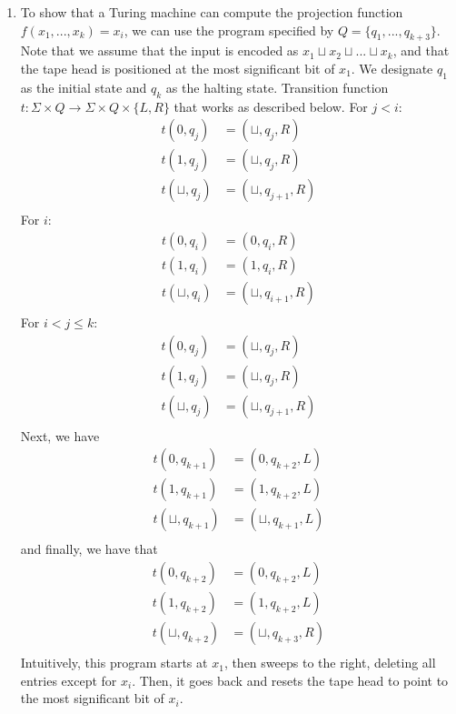 \documentclass{article}
\begin{document}
\begin{enumerate}
    \item To show that a Turing machine can compute the projection function $f(x_1, ..., x_k) = x_i$, we can use the program specified by $Q = \{q_1, ..., q_{k+3}\}$. 
    Note that we assume that the input is encoded as $x_1 \sqcup x_2 \sqcup ... \sqcup x_k$, and that the tape head is positioned at the most significant bit of $x_1$.
    We designate $q_1$ as the initial state and $q_k$ as the halting state. 
    Transition function $t: \Sigma \times Q \to \Sigma \times Q \times \{L, R\}$ that works as described below.
    For $j < i$:
    \begin{align*}
        t(0, q_j) &= (\sqcup, q_j, R)\\
        t(1, q_j) &= (\sqcup, q_j, R)\\
        t(\sqcup, q_j) &= (\sqcup, q_{j+1}, R) \\
    \end{align*}
    For $i$:
    \begin{align*}
        t(0, q_i) &= (0, q_i, R)\\
        t(1, q_i) &= (1, q_i, R)\\
        t(\sqcup, q_i) &= (\sqcup, q_{i+1}, R) \\
    \end{align*}
    For $i < j \leq k$:
    \begin{align*}
        t(0, q_j) &= (\sqcup, q_j, R)\\
        t(1, q_j) &= (\sqcup, q_j, R)\\
        t(\sqcup, q_j) &= (\sqcup, q_{j+1}, R) \\
    \end{align*}
    Next, we have
    \begin{align*}
        t(0, q_{k+1}) &= (0, q_{k+2}, L)\\
        t(1, q_{k+1}) &= (1, q_{k+2}, L)\\
        t(\sqcup, q_{k+1}) &= (\sqcup, q_{k+1}, L) \\
    \end{align*}
    and finally, we have that
    \begin{align*}
        t(0, q_{k+2}) &= (0, q_{k+2}, L)\\
        t(1, q_{k+2}) &= (1, q_{k+2}, L)\\
        t(\sqcup, q_{k+2}) &= (\sqcup, q_{k+3}, R) \\
    \end{align*}
    Intuitively, this program starts at $x_1$, then sweeps to the right, deleting all entries except for $x_i$.
    Then, it goes back and resets the tape head to point to the most significant bit of $x_i$.
    

\end{enumerate}
\end{document}

